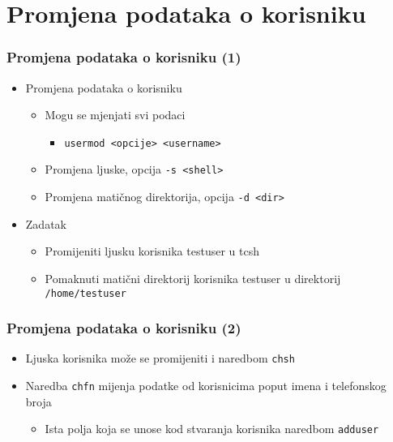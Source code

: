 \documentclass{beamer}
\newcommand{\shell}[1]{\texttt{#1}}
\begin{document}
\section{Promjena podataka o korisniku}
\begin{frame}[t]
\frametitle{Promjena podataka o korisniku (1)}
\begin{itemize}
  \item Promjena podataka o korisniku
  \begin{itemize}
    \item Mogu se mjenjati svi podaci
    \begin{itemize}
      \item[] \shell{usermod <opcije> <username>}
    \end{itemize}
    \item Promjena ljuske, opcija \shell{-s <shell>}
    \item Promjena matičnog direktorija, opcija \shell{-d <dir>}
  \end{itemize}
  \item Zadatak
  \begin{itemize}
    \item Promijeniti ljusku korisnika testuser u tcsh
    \item Pomaknuti matični direktorij korisnika testuser u direktorij 
          \shell{/home/testuser}
  \end{itemize}
\end{itemize}
\end{frame}

\begin{frame}[t]
\frametitle{Promjena podataka o korisniku (2)}
\begin{itemize}
  \item Ljuska korisnika može se promijeniti i  naredbom \shell{chsh}
  \item Naredba \shell{chfn} mijenja podatke od korisnicima poput imena 
        i telefonskog broja
  \begin{itemize}
    \item Ista polja koja se unose kod stvaranja korisnika naredbom 
          \shell{adduser}
  \end{itemize}
\end{itemize}
\end{frame}
\end{document}
